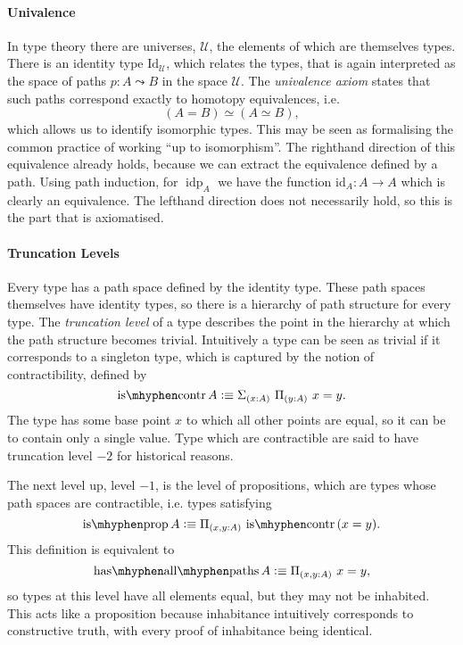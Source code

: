 \documentclass[12pt, parskip, DIV=14]{scrbook}
\newcommand{\defeq}{\vcentcolon\equiv}
\newcommand{\idp}{\operatorname{idp}}
\newcommand{\iscontr}{\operatorname{is\mhyphen contr}}
\newcommand{\isprop}{\operatorname{is\mhyphen prop}}
\newcommand{\hasallpaths}{\operatorname{has\mhyphen all\mhyphen paths}}
\begin{document}
\paragraph{Univalence}

In type theory there are universes, $\mathcal{U}$, the elements of which are themselves types. There is an identity type $\mathrm{Id}_\mathcal{U}$, which relates the types, that is again interpreted as the space of paths $p : A \leadsto B$ in the space $\mathcal{U}$. The \textit{univalence axiom} states that such paths correspond exactly to homotopy equivalences, i.e. $$(A = B) \simeq (A \simeq B),$$ which allows us to identify isomorphic types. This may be seen as formalising the common practice of working ``up to isomorphism''.  The righthand direction of this equivalence already holds, because we can extract the equivalence defined by a path. Using path induction, for $\idp_A$ we have the function $\mathrm{id}_A : A \to A$ which is clearly an equivalence. The lefthand direction does not necessarily hold, so this is the part that is axiomatised.

\paragraph{Truncation Levels}

Every type has a path space defined by the identity type. These path spaces themselves have identity types, so there is a hierarchy of path structure for every type. The \textit{truncation level} of a type describes the point in the hierarchy at which the path structure becomes trivial. Intuitively a type can be seen as trivial if it corresponds to a singleton type, which is captured by the notion of contractibility, defined by
$$\iscontr A \defeq \Sigma_{(x : A)}~\Pi_{(y : A)}~x = y.$$
The type has some base point $x$ to which all other points are equal, so it can be to contain only a single value. Type which are contractible are said to have truncation level $-2$ for historical reasons.

The next level up, level $-1$, is the level of propositions, which are types whose path spaces are contractible, i.e. types satisfying
$$\isprop A \defeq \Pi_{(x,y :A)}\,\iscontr\,(x = y).$$
This definition is equivalent to
$$\hasallpaths A \defeq \Pi_{(x , y : A)}~x = y,$$
so types at this level have all elements equal, but they may not be inhabited. This acts like a proposition because inhabitance intuitively corresponds to constructive truth, with every proof of inhabitance being identical.
\end{document}

